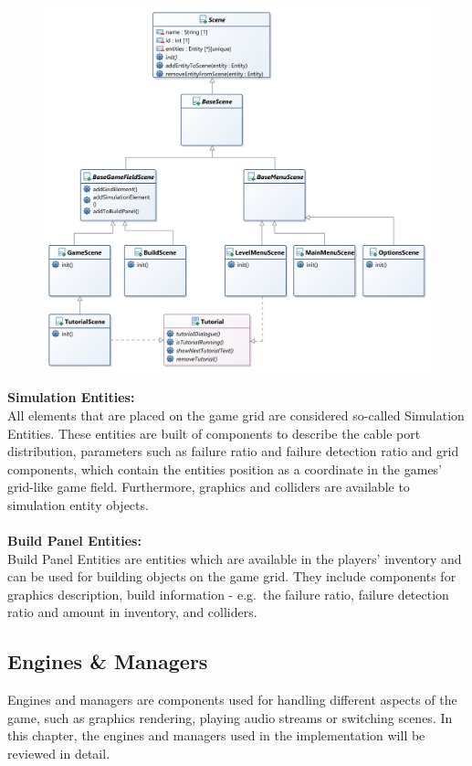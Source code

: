 \begin{figure}
    \centering
    \includegraphics[width=\textwidth]{Pictures/res/implementation/scenes-hierarchy}
    \label{fig:scenes-hierachry}
\end{figure}

\textbf{Simulation Entities:} \\
All elements that are placed on the game grid are considered so-called Simulation Entities.
These entities are built of components to describe the cable port distribution, parameters such as failure ratio and failure detection ratio and grid components, which contain the
entities position as a coordinate in the games' grid-like game field.
Furthermore, graphics and colliders are available to simulation entity objects.
\\ \\
\textbf{Build Panel Entities:} \\
Build Panel Entities are entities which are available in the players' inventory and can be used for building objects on the game grid.
They include components for graphics description, build information - e.g.\ the failure ratio, failure detection ratio and amount in inventory,
and colliders.

\subsection{Engines \& Managers}\label{subsec:engines}
Engines and managers are components used for handling different aspects of the game, such as graphics rendering, playing audio streams
or switching scenes.
In this chapter, the engines and managers used in the implementation will be reviewed in detail.

